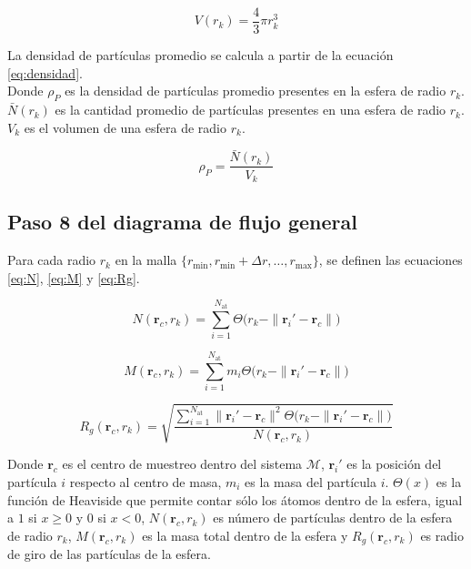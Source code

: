 	 
	 \begin{equation}
	 	V(r_k) = \frac{4}{3} \pi r_{k}^{3}
	 	\label{eq:volumen}
	 \end{equation}
	 
	 La densidad de part\'{i}culas promedio se calcula a partir de la ecuaci\'{o}n \ref{eq:densidad}. \\
	 Donde \(\rho_{P}\) es la densidad de part\'{i}culas promedio presentes en la esfera de radio \(r_k\).\\
	 \(\bar N(r_{k})\) es la cantidad promedio de part\'{i}culas presentes en una esfera de radio \(r_k\).
	 \(V_{k}\) es el volumen de una esfera de radio \(r_{k}\).
	 
	 \begin{equation}
	 	\rho_P = \frac{\bar N(r_{k})}{V_{k}}
	 	\label{eq:densidad}
	 \end{equation}
	 

	\subsection{Paso 8 del diagrama de flujo general}
	\label{subsec:paso8}

	Para cada radio $r_k$ en la malla $\{r_{\text{min}}, r_{\text{min}} + \Delta r, \ldots, r_{\text{max}}\}$, se definen las ecuaciones \ref{eq:N}, \ref{eq:M} y \ref{eq:Rg}.
	
	\begin{equation}
		N(\mathbf{r}_c, r_k) = \sum_{i=1}^{N_{\text{at}}} 
		\Theta\!\bigl(r_k - \|\mathbf{r}_i' - \mathbf{r}_c\|\bigr)
		\label{eq:N}
	\end{equation}
	
	\begin{equation}
		M(\mathbf{r}_c, r_k) = \sum_{i=1}^{N_{\text{at}}} 
		m_i \Theta\!\bigl(r_k - \|\mathbf{r}_i' - \mathbf{r}_c\|\bigr)
		\label{eq:M}
	\end{equation}
	
	\begin{equation}
		R_g(\mathbf{r}_c, r_k) = 
		\sqrt{\frac{\displaystyle\sum_{i=1}^{N_{\text{at}}} 
				\|\mathbf{r}_i' - \mathbf{r}_c\|^2  
				\Theta\!\bigl(r_k - \|\mathbf{r}_i' - \mathbf{r}_c\|\bigr)}
			{N(\mathbf{r}_c, r_k)}}
		\label{eq:Rg}
	\end{equation}
	
	Donde $\mathbf{r}_c$ es el centro de muestreo dentro del sistema $\mathcal{M}$,
	$\mathbf{r}_i'$ es la posici\'{o}n del part\'{i}cula $i$ respecto al centro de masa, 
	$m_i$ es la masa del part\'{i}cula $i$. $\Theta(x)$ es la funci\'{o}n de Heaviside que permite contar s\'{o}lo los \'{a}tomos dentro de la esfera, igual a $1$ si $x \ge 0$ y $0$ si $x < 0$, $N(\mathbf{r}_c, r_k)$ es n\'{u}mero de part\'{i}culas dentro de la esfera de radio $r_k$, $M(\mathbf{r}_c, r_k)$ es la masa total dentro de la esfera y 
	$R_g(\mathbf{r}_c, r_k)$ es radio de giro de las part\'{i}culas de la esfera.
	
